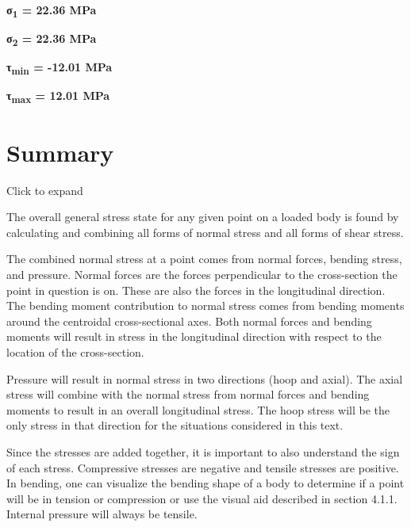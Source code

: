 \documentclass[
  letterpaper,
  DIV=11,
  numbers=noendperiod]{scrreprt}
\begin{document}
\begin{tcolorbox}
\begin{tcolorbox}
\textbf{σ\textsubscript{1} = 22.36 MPa}

\textbf{σ\textsubscript{2} = 22.36 MPa}

\textbf{τ\textsubscript{min} = -12.01 MPa}

\textbf{τ\textsubscript{max} = 12.01 MPa}

\end{tcolorbox}

\end{tcolorbox}

\section{Summary}\label{summary-12}

Click to expand

\begin{tcolorbox}[enhanced jigsaw, breakable, opacityback=0, toptitle=1mm, left=2mm, colback=white, opacitybacktitle=0.6, colframe=quarto-callout-note-color-frame, titlerule=0mm, arc=.35mm, leftrule=.75mm, bottomtitle=1mm, colbacktitle=quarto-callout-note-color!10!white, rightrule=.15mm, title={Key takeaways}, bottomrule=.15mm, toprule=.15mm, coltitle=black]

The overall general stress state for any given point on a loaded body is
found by calculating and combining all forms of normal stress and all
forms of shear stress.

The combined normal stress at a point comes from normal forces, bending
stress, and pressure. Normal forces are the forces perpendicular to the
cross-section the point in question is on. These are also the forces in
the longitudinal direction. The bending moment contribution to normal
stress comes from bending moments around the centroidal cross-sectional
axes. Both normal forces and bending moments will result in stress in
the longitudinal direction with respect to the location of the
cross-section.

Pressure will result in normal stress in two directions (hoop and
axial). The axial stress will combine with the normal stress from normal
forces and bending moments to result in an overall longitudinal stress.
The hoop stress will be the only stress in that direction for the
situations considered in this text.

Since the stresses are added together, it is important to also
understand the sign of each stress. Compressive stresses are negative
and tensile stresses are positive. In bending, one can visualize the
bending shape of a body to determine if a point will be in tension or
compression or use the visual aid described in section 4.1.1. Internal
pressure will always be tensile.


\end{tcolorbox}
\end{document}
